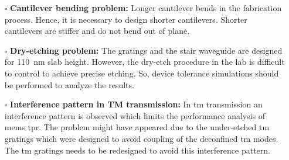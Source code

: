 \documentclass[../report.tex]{subfiles}
\begin{document}
\begin{itemize}
	\item[$\square$] \textbf{Cantilever bending problem:} Longer cantilever bends in the fabrication process. Hence,  it is necessary to design shorter cantilevers. Shorter cantilevers are stiffer and do not bend out of plane.
	
	\item[$\square$] \textbf{Dry-etching problem:} The gratings and the stair waveguide are designed for \SI{110}{\nano \meter} slab height. However, the dry-etch procedure in the lab is difficult to control to achieve precise etching. So, device tolerance simulations should be performed to analyze the results.
	\item[$\square$] \textbf{Interference pattern in TM transmission:} In \gls{tm} transmission an interference pattern is observed which limits the performance analysis of \gls{mems} \gls{tpr}. The problem might have appeared due to the under-etched \gls{tm} gratings which were designed to avoid coupling of the deconfined \gls{tm} modes. The \gls{tm} gratings needs to be redesigned to avoid this interference pattern.  
	
	
\end{itemize} 
	
\end{document}
